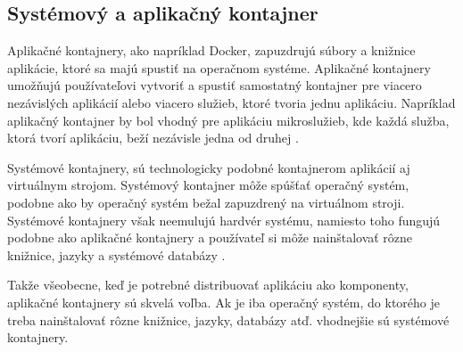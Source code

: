 \subsection{Systémový a aplikačný kontajner}

Aplikačné kontajnery, ako napríklad Docker, zapuzdrujú súbory a knižnice aplikácie, ktoré sa majú spustiť na operačnom systéme. Aplikačné kontajnery umožňujú používateľovi vytvoriť a spustiť samostatný kontajner pre viacero nezávislých aplikácií alebo viacero služieb, ktoré tvoria jednu aplikáciu. Napríklad aplikačný kontajner by bol vhodný pre aplikáciu mikroslužieb, kde každá služba, ktorá tvorí aplikáciu, beží nezávisle jedna od druhej \cite{systemvsapli1}.

Systémové kontajnery, sú technologicky podobné kontajnerom aplikácií aj virtuálnym strojom. Systémový kontajner môže spúšťať operačný systém, podobne ako by operačný systém bežal zapuzdrený na virtuálnom stroji. Systémové kontajnery však neemulujú hardvér systému, namiesto toho fungujú podobne ako aplikačné kontajnery a používateľ si môže nainštalovať rôzne knižnice, jazyky a systémové databázy \cite{systemvsapli}.

Takže všeobecne, keď je potrebné distribuovať aplikáciu ako komponenty, aplikačné kontajnery sú skvelá voľba. Ak je iba operačný systém, do ktorého je treba nainštalovať rôzne knižnice, jazyky, databázy atď. vhodnejšie sú systémové kontajnery.

